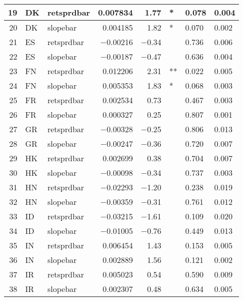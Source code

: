 \begin{longtable}{|r|l|l|r|r|l|l|l|}
   19 &    DK &    retsprdbar &    0.007834 &    1.77 &    * &    0.078 &    0.004\\\hline
   20 &    DK &    slopebar &    0.004185 &    1.82 &    * &    0.070 &    0.002\\\hline
   21 &    ES &    retsprdbar &    $-$0.00216 &    $-$0.34 &      &    0.736 &    0.006\\\hline
   22 &    ES &    slopebar &    $-$0.00187 &    $-$0.47 &      &    0.636 &    0.004\\\hline
   23 &    FN &    retsprdbar &    0.012206 &    2.31 &    ** &    0.022 &    0.005\\\hline
   24 &    FN &    slopebar &    0.005353 &    1.83 &    * &    0.068 &    0.003\\\hline
   25 &    FR &    retsprdbar &    0.002534 &    0.73 &      &    0.467 &    0.003\\\hline
   26 &    FR &    slopebar &    0.000327 &    0.25 &      &    0.807 &    0.001\\\hline
   27 &    GR &    retsprdbar &    $-$0.00328 &    $-$0.25 &      &    0.806 &    0.013\\\hline
   28 &    GR &    slopebar &    $-$0.00247 &    $-$0.36 &      &    0.720 &    0.007\\\hline
   29 &    HK &    retsprdbar &    0.002699 &    0.38 &      &    0.704 &    0.007\\\hline
   30 &    HK &    slopebar &    $-$0.00098 &    $-$0.34 &      &    0.737 &    0.003\\\hline
   31 &    HN &    retsprdbar &    $-$0.02293 &    $-$1.20 &      &    0.238 &    0.019\\\hline
   32 &    HN &    slopebar &    $-$0.00359 &    $-$0.31 &      &    0.761 &    0.012\\\hline
   33 &    ID &    retsprdbar &    $-$0.03215 &    $-$1.61 &      &    0.109 &    0.020\\\hline
   34 &    ID &    slopebar &    $-$0.01005 &    $-$0.76 &      &    0.449 &    0.013\\\hline
   35 &    IN &    retsprdbar &    0.006454 &    1.43 &      &    0.153 &    0.005\\\hline
   36 &    IN &    slopebar &    0.002889 &    1.56 &      &    0.121 &    0.002\\\hline
   37 &    IR &    retsprdbar &    0.005023 &    0.54 &      &    0.590 &    0.009\\\hline
   38 &    IR &    slopebar &    0.002307 &    0.48 &      &    0.634 &    0.005\\\hline

\end{longtable}
